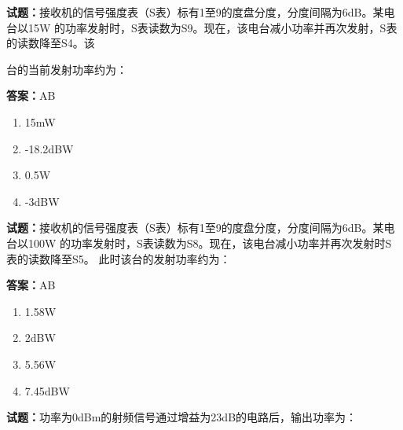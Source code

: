 \documentclass{ctexbook}
\begin{document}




\vspace{1em}

\textbf{试题：}接收机的信号强度表（S表）标有1至9的度盘分度，分度间隔为6dB。某电台以15W
的功率发射时，S表读数为S9。现在，该电台减小功率并再次发射，S表的读数降至S4。该


台的当前发射功率约为： 

\textbf{答案：}AB 

\begin{enumerate}[leftmargin=3em]
  \item 15mW 

  \item -18.2dBW 

  \item 0.5W 

  \item -3dBW 

\end{enumerate}





\vspace{1em}

\textbf{试题：}接收机的信号强度表（S表）标有1至9的度盘分度，分度间隔为6dB。某电台以100W
的功率发射时，S表读数为S8。现在，该电台减小功率并再次发射时S表的读数降至S5。
此时该台的发射功率约为： 

\textbf{答案：}AB 

\begin{enumerate}[leftmargin=3em]
  \item 1.58W 

  \item 2dBW 

  \item 5.56W 

  \item 7.45dBW 

\end{enumerate}





\vspace{1em}

\textbf{试题：}功率为0dBm的射频信号通过增益为23dB的电路后，输出功率为： 
\end{document}
